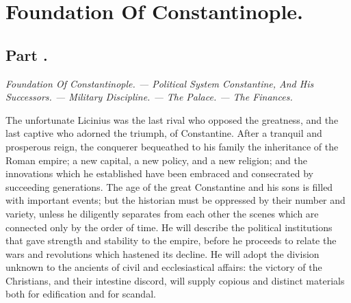 \chapter{Foundation Of Constantinople.}
\section{Part \thesection.}

\textit{Foundation Of Constantinople. — Political System Constantine, And
His Successors. — Military Discipline. — The Palace. — The Finances.}
\vspace{\onelineskip}

The unfortunate Licinius was the last rival who opposed the
greatness, and the last captive who adorned the triumph, of
Constantine. After a tranquil and prosperous reign, the conquerer
bequeathed to his family the inheritance of the Roman empire; a
new capital, a new policy, and a new religion; and the
innovations which he established have been embraced and
consecrated by succeeding generations. The age of the great
Constantine and his sons is filled with important events; but the
historian must be oppressed by their number and variety, unless
he diligently separates from each other the scenes which are
connected only by the order of time. He will describe the
political institutions that gave strength and stability to the
empire, before he proceeds to relate the wars and revolutions
which hastened its decline. He will adopt the division unknown to
the ancients of civil and ecclesiastical affairs: the victory of
the Christians, and their intestine discord, will supply copious
and distinct materials both for edification and for scandal.

